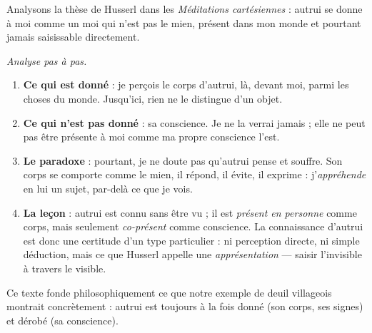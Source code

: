 \documentclass[11pt]{article}
\begin{document}
\begin{experience}
Analysons la thèse de Husserl dans les \emph{Méditations cartésiennes} : autrui se donne à moi comme un moi qui n'est pas le mien, présent dans mon monde et pourtant jamais saisissable directement.

\emph{Analyse pas à pas.}
\begin{enumerate}
\item \textbf{Ce qui est donné} : je perçois le corps d'autrui, là, devant moi, parmi les choses du monde. Jusqu'ici, rien ne le distingue d'un objet.
\item \textbf{Ce qui n'est pas donné} : sa conscience. Je ne la verrai jamais ; elle ne peut pas être présente à moi comme ma propre conscience l'est.
\item \textbf{Le paradoxe} : pourtant, je ne doute pas qu'autrui pense et souffre. Son corps se comporte comme le mien, il répond, il évite, il exprime : j'\emph{appréhende} en lui un sujet, par-delà ce que je vois.
\item \textbf{La leçon} : autrui est connu sans être vu ; il est \emph{présent en personne} comme corps, mais seulement \emph{co-présent} comme conscience. La connaissance d'autrui est donc une certitude d'un type particulier : ni perception directe, ni simple déduction, mais ce que Husserl appelle une \emph{apprésentation} — saisir l'invisible à travers le visible.
\end{enumerate}
Ce texte fonde philosophiquement ce que notre exemple de deuil villageois montrait concrètement : autrui est toujours à la fois donné (son corps, ses signes) et dérobé (sa conscience).
\end{experience}
\end{document}
